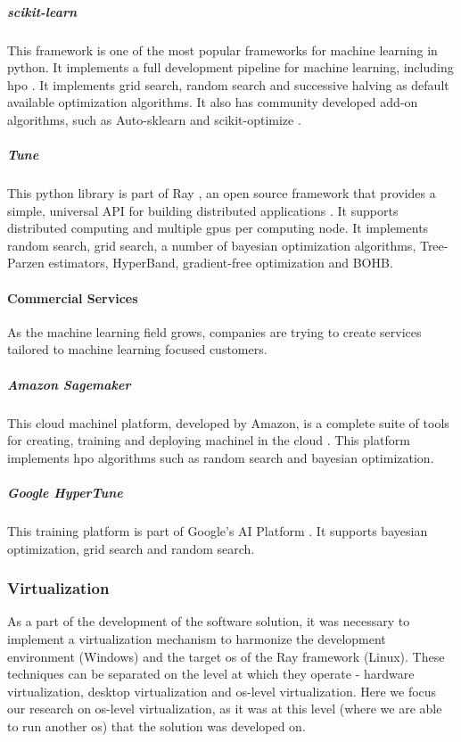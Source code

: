 \subparagraph{scikit-learn} This framework is one of the most popular frameworks for machine learning in \acrshort{python}. It implements a full development pipeline for machine learning, including \acrshort{hpo} \parencite{scikit-learn}. It implements grid search, random search and successive halving as default available optimization algorithms. It also has community developed add-on algorithms, such as Auto-sklearn \parencite{auto-sklearn} and scikit-optimize \parencite{scikit-optimize}.

\subparagraph{Tune} This \acrshort{python} library is part of Ray \parencite{ray}, an open source framework that provides a simple, universal API for building distributed applications \parencite{liaw2018tune}. It supports distributed computing and multiple \acrshort{gpu}s per computing node. It implements random search, grid search, a number of bayesian optimization algorithms, Tree-Parzen estimators, HyperBand, gradient-free optimization and BOHB.

\paragraph{Commercial Services} 

As the machine learning field grows, companies are trying to create services tailored to machine learning focused customers.

\subparagraph{Amazon Sagemaker} This cloud \acrshort{machinel} platform, developed by Amazon, is a complete suite of tools for creating, training and deploying \acrshort{machinel} in the cloud \parencite{sagemaker}. This platform implements \acrshort{hpo} algorithms such as random search and bayesian optimization.

\subparagraph{Google HyperTune} This training platform is part of Google's AI Platform \parencite{ghypertune}. It supports bayesian optimization, grid search and random search.   

\subsubsection{Virtualization}


As a part of the development of the software solution, it was necessary to implement a virtualization mechanism to harmonize the development environment (Windows) and the target \acrfull{os} of the Ray framework (Linux). These techniques can be separated on the level at which they operate - hardware virtualization, desktop virtualization and \acrshort{os}-level virtualization. Here we focus our research on \acrshort{os}-level virtualization, as it was at this level (where we are able to run another \acrshort{os}) that the solution was developed on.

